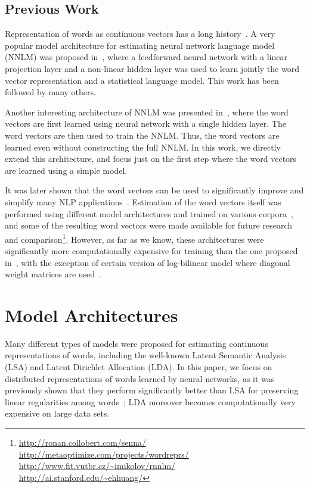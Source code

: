 \documentclass{article} %
\begin{document}
\subsection{Previous Work}

Representation of words as continuous vectors has a long history~\cite{Hinton, BPTT, Elman}. A very popular model architecture for estimating neural network language model (NNLM) was proposed in~\cite{Bengio},
where a feedforward neural network with a linear projection layer and a non-linear hidden layer was used to learn jointly the word vector representation and a statistical language model. This work has been
followed by many others.

Another interesting architecture of NNLM was presented in~\cite{dip, Mikolov}, where the word vectors are first learned using neural network with a single hidden layer. The
word vectors are then used to train the NNLM. Thus, the word vectors are learned even without constructing the full NNLM.
In this work, we directly extend this architecture, and focus just on the first step where the word vectors are learned using a simple model.

It was later shown that the word vectors can be used to significantly improve and simplify many NLP applications~\cite{Collobert1, Collobert2, Turian}. Estimation of the word vectors itself was
performed using different model architectures and trained on various corpora~\cite{Collobert1, Turian, Mnih, thesis, Huang}, and some of the resulting word vectors were made
available for future research and comparison\footnote{\url{http://ronan.collobert.com/senna/} \\ \url{http://metaoptimize.com/projects/wordreprs/} \\ \url{http://www.fit.vutbr.cz/~imikolov/rnnlm/} \\ \url{http://ai.stanford.edu/~ehhuang/} }.
However, as far as we know, these architectures were significantly more computationally expensive for training
than the one proposed in~\cite{dip}, with the exception of certain version of log-bilinear model where diagonal weight matrices are used~\cite{Mnih}.

\section{Model Architectures}

Many different types of models were proposed for estimating continuous representations of words, including the well-known Latent Semantic Analysis (LSA) and Latent Dirichlet Allocation (LDA). In this paper, we focus
on distributed representations of words learned by neural networks, as it was previously shown that they perform significantly better than LSA for preserving linear regularities among words~\cite{NAACL1, NAACL2}; LDA moreover becomes computationally
very expensive on large data sets.
\end{document}

